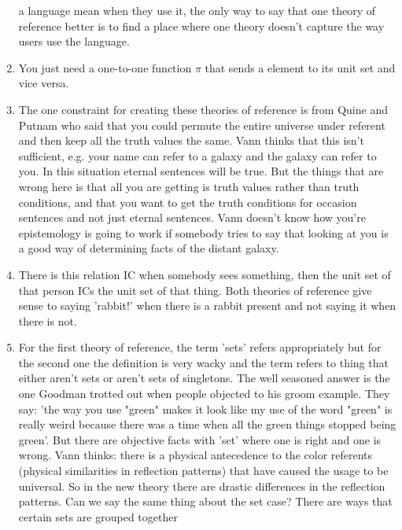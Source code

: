 \documentclass[12pt]{article}
\theoremstyle{definition}
\begin{document}
\begin{enumerate}
        a language mean when they use it, the only way to say that one theory
        of reference better is to find a place where one theory doesn't capture
        the way users use the language.
    \item
        You just need a one-to-one function $\pi$ that sends a element to its
        unit set and vice versa. 
    \item
        The one constraint for creating these theories of reference is from
        Quine and Putnam who said that you could permute the entire universe
        under referent and then keep all the truth values the same. Vann
        thinks that this isn't sufficient, e.g. your name can refer to a galaxy
        and the galaxy can refer to you. In this situation eternal sentences
        will be true. But the things that are wrong here is that all you are
        getting is truth values rather than truth conditions, and that you want
        to get the truth conditions for occasion sentences and not just eternal
        sentences. Vann doesn't know how you're epistemology is going to work
        if somebody tries to say that looking at you is a good way of
        determining facts of the distant galaxy. 
    \item
        There is this relation IC when somebody sees something, then the unit
        set of that person ICs the unit set of that thing. Both theories of
        reference give sense to saying 'rabbit!' when there is a rabbit
        present and not saying it when there is not.
    \item
        For the first theory of reference, the term 'sets' refers appropriately
        but for the second one the definition is very wacky and the term refers
        to thing that either aren't sets or aren't sets of singletons. The well
        seasoned answer is the one Goodman trotted out when people objected to
        his groom example. They say: 'the way you use "green" makes it look
        like my use of the word "green" is really weird because there was a
        time when all the green things stopped being green'. But there are
        objective facts with 'set' where one is right and one is wrong. Vann
        thinks: there is a physical antecedence to the color referents
        (physical similarities in reflection patterns) that have caused the
        usage to be universal. So in the new theory there are drastic
        differences in the reflection patterns. Can we say the same thing about
        the set case? There are ways that certain sets are grouped together

\end{enumerate}
\end{document}

